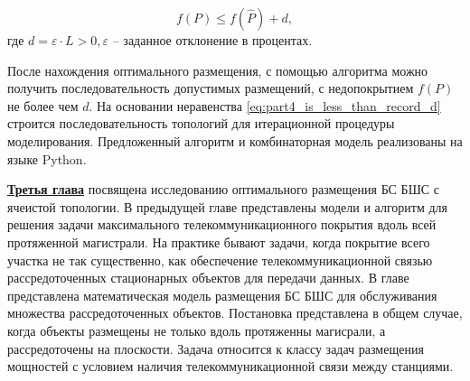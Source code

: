 
\begin{equation}
    \label{eq:part4_is_less_than_record_d}
    f(P) \leqslant f(\widehat{P}) + d,
\end{equation}
где $d = \varepsilon \cdot L > 0, \varepsilon$ -- заданное отклонение в процентах.

 
После нахождения оптимального размещения, с помощью алгоритма можно получить последовательность допустимых размещений, с недопокрытием $f(P)$ не более чем $d$.  На основании неравенства \cref{eq:part4_is_less_than_record_d} строится последовательность топологий для итерационной процедуры моделирования. Предложенный алгоритм и комбинаторная модель реализованы на языке Python.




\underline{\textbf{Третья глава}} посвящена исследованию оптимального размещения БС БШС с ячеистой топологии. В предыдущей главе представлены модели и алгоритм для решения задачи максимального телекоммуникационного покрытия вдоль всей протяженной магистрали. На практике бывают задачи, когда покрытие всего  участка не так существенно, как обеспечение телекоммуникационной связью  рассредоточенных стационарных объектов для передачи данных. В главе представлена математическая модель размещения БС БШС для обслуживания множества рассредоточенных объектов. Постановка представлена в общем случае, когда объекты размещены не только вдоль протяженны магисрали, а рассредоточены на плоскости. Задача относится к классу задач размещения мощностей с условием наличия телекоммуникационной связи между станциями.

